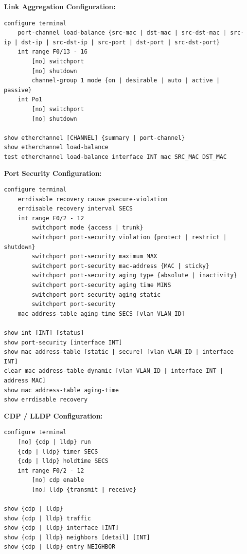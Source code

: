 \documentclass[12pt]{article}
\begin{document}
	\noindent\textbf{Link Aggregation Configuration:}
	\begin{lstlisting}
configure terminal
	port-channel load-balance {src-mac | dst-mac | src-dst-mac | src-ip | dst-ip | src-dst-ip | src-port | dst-port | src-dst-port}
	int range F0/13 - 16
		[no] switchport
		[no] shutdown
		channel-group 1 mode {on | desirable | auto | active | passive}
	int Po1
		[no] switchport
		[no] shutdown

show etherchannel [CHANNEL] {summary | port-channel}
show etherchannel load-balance
test etherchannel load-balance interface INT mac SRC_MAC DST_MAC
	\end{lstlisting}
	\vspace{8px}

	\noindent\textbf{Port Security Configuration:}
	\begin{lstlisting}
configure terminal
	errdisable recovery cause psecure-violation
	errdisable recovery interval SECS
	int range F0/2 - 12
		switchport mode {access | trunk}
		switchport port-security violation {protect | restrict | shutdown}
		switchport port-security maximum MAX
		switchport port-security mac-address {MAC | sticky}
		switchport port-security aging type {absolute | inactivity}
		switchport port-security aging time MINS
		switchport port-security aging static
		switchport port-security
	mac address-table aging-time SECS [vlan VLAN_ID]

show int [INT] [status]
show port-security [interface INT]
show mac address-table [static | secure] [vlan VLAN_ID | interface INT]
clear mac address-table dynamic [vlan VLAN_ID | interface INT | address MAC]
show mac address-table aging-time
show errdisable recovery
	\end{lstlisting}
	\vspace{8px}

	\noindent\textbf{CDP / LLDP Configuration:}
	\begin{lstlisting}
configure terminal
	[no] {cdp | lldp} run
	{cdp | lldp} timer SECS
	{cdp | lldp} holdtime SECS
	int range F0/2 - 12
		[no] cdp enable
		[no] lldp {transmit | receive}

show {cdp | lldp}
show {cdp | lldp} traffic
show {cdp | lldp} interface [INT]
show {cdp | lldp} neighbors [detail] [INT]
show {cdp | lldp} entry NEIGHBOR
	\end{lstlisting}
	\vspace{8px}
\end{document}
